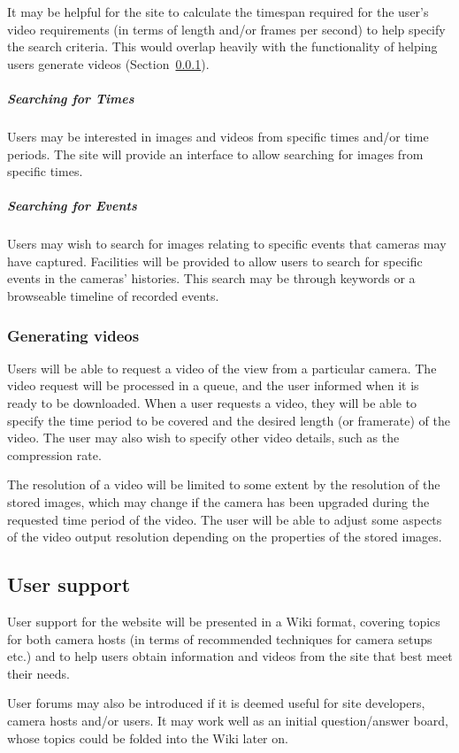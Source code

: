 \documentclass[11pt]{article}
\begin{document}
It may be helpful for the site to calculate the timespan required for the user's video requirements (in terms of length and/or frames per second) to help specify the search criteria. This would overlap heavily with the functionality of helping users generate videos (Section~\ref{generate_video}).

\subparagraph{Searching for Times}
Users may be interested in images and videos from specific times and/or time periods. The site will provide an interface to allow searching for images from specific times.

\subparagraph{Searching for Events} Users may wish to search for images relating to specific events that cameras may have captured. Facilities will be provided to allow users to search for specific events in the cameras' histories. This search may be through keywords or a browseable timeline of recorded events.


\subsubsection{Generating videos}
\label{generate_video}
Users will be able to request a video of the view from a particular camera. The video request will be processed in a queue, and the user informed when it is ready to be downloaded. When a user requests a video, they will be able to specify the time period to be covered and the desired length (or framerate) of the video. The user may also wish to specify other video details, such as the compression rate.

The resolution of a video will be limited to some extent by the resolution of the stored images, which may change if the camera has been upgraded during the requested time period of the video. The user will be able to adjust some aspects of the video output resolution depending on the properties of the stored images.

\subsection{User support}
User support for the website will be presented in a Wiki format, covering topics for both camera hosts (in terms of recommended techniques for camera setups etc.) and to help users obtain information and videos from the site that best meet their needs.

User forums may also be introduced if it is deemed useful for site developers, camera hosts and/or users. It may work well as an initial question/answer board, whose topics could be folded into the Wiki later on.
\end{document}
